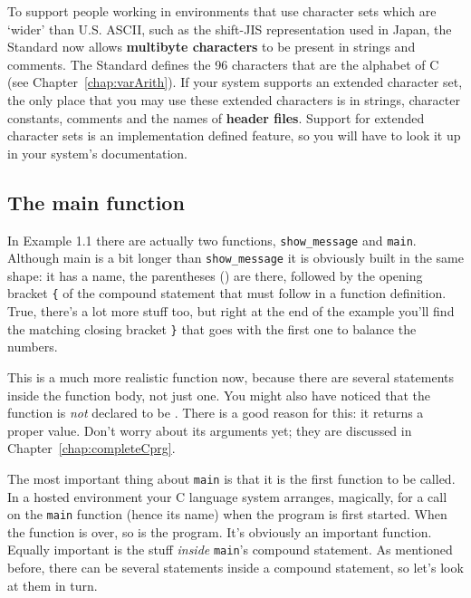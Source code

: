    To support people working in environments that use character sets which
    are `wider' than U.S. ASCII, such as the shift-JIS representation
    used in Japan, the Standard now allows \textbf{multibyte characters} to
    be present in strings and comments. The Standard defines the
    96 characters that are the alphabet of C (see Chapter~\ref{chap:varArith}).
    If your system supports an extended character set, the only
    place that you may use these extended characters is in strings, character
    constants, comments and the names of \textbf{header files}. Support for
    extended character sets is an implementation defined feature, so you will
    have to look it up in your system's documentation.


  

  \subsection{The main function}
   

   In Example 1.1 there are actually two functions,
    \texttt{show\_message} and \texttt{main}. Although main is a bit
    longer than \texttt{show\_message} it is obviously built in the same
    shape: it has a name, the parentheses () are there, followed by the opening
    bracket \texttt{\{} of the compound statement that must follow in a
    function definition. True, there's a lot more stuff too, but right at the
    end of the example you'll find the matching closing bracket \texttt{\}}
    that goes with the first one to balance the numbers.


   This is a much more realistic function now, because there are several
    statements inside the function body, not just one. You might also have
    noticed that the function is \textit{not} declared to be
    \void. There is a good reason for this: it returns a proper
    value. Don't worry about its arguments yet; they are discussed in
    Chapter~\ref{chap:completeCprg}.


   The most important thing about \texttt{main} is that it is the first
    function to be called. In a hosted environment your C language system
    arranges, magically, for a call on the \texttt{main} function (hence
    its name) when the program is first started. When the function is over, so
    is the program. It's obviously an important function. Equally important is
    the stuff \textit{inside} \texttt{main}'s compound statement. As
    mentioned before, there can be several statements inside a compound
    statement, so let's look at them in turn.


